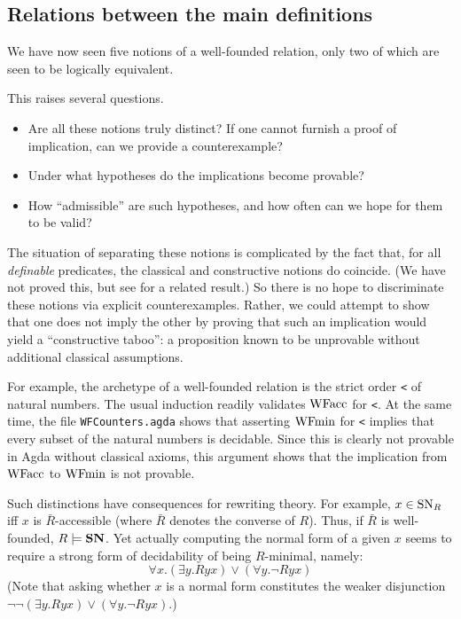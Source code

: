\subsection{Relations between the main definitions}

We have now seen five notions of a well-founded relation, only two of which
are seen to be logically equivalent.

This raises several questions.
\begin{itemize}
\item Are all these notions truly distinct?  If one cannot furnish a proof of implication,
can we provide a counterexample?
\item Under what hypotheses do the implications become provable?
\item How ``admissible'' are such hypotheses, and how often can we hope for them to be valid?
\end{itemize}

The situation of separating these notions is complicated by the fact that, for all
\emph{definable} predicates, the classical and constructive notions do coincide.
(We have not proved this, but see \cite{Berardi} for a related result.)
So there is no hope to discriminate these notions via explicit counterexamples.
Rather, we could attempt to show that one does not imply the other by proving that
such an implication would yield a ``constructive taboo'': a proposition known to be
unprovable without additional classical assumptions.

For example, the archetype of a well-founded relation is the strict order \verb|<|
of natural numbers.  The usual induction readily validates $\mathrm{WFacc}$ for \verb|<|.
  At the same time, the file \texttt{WFCounters.agda} shows that
asserting $\mathrm{WFmin}$ for \verb|<| implies that every subset of the natural numbers is decidable.  Since this is clearly not provable in Agda without classical axioms,
this argument shows that the implication from $\mathrm{WFacc}$ to $\mathrm{WFmin}$ is not provable.

Such distinctions have consequences for rewriting theory.
For example, $x\in \mathrm{SN}_R$ iff $x$ is $\bar{R}$-accessible (where $\bar{R}$ denotes
the converse of $R$).  Thus, if $\bar{R}$ is well-founded, $R \models \mathbf{SN}$.
Yet actually computing the normal form of a given $x$ seems to require a
strong form of decidability of being $R$-minimal, namely:
\[
\tag{$\isMinDec$} \forall x. \left(\exists y. Ryx\right) \lor \left(\forall y. \lnot Ryx\right)
\]
(Note that asking whether $x$ is a normal form constitutes the weaker disjunction
$\lnot\lnot\left(\exists y. Ryx\right) \lor \left(\forall y. \lnot Ryx\right)$.)

